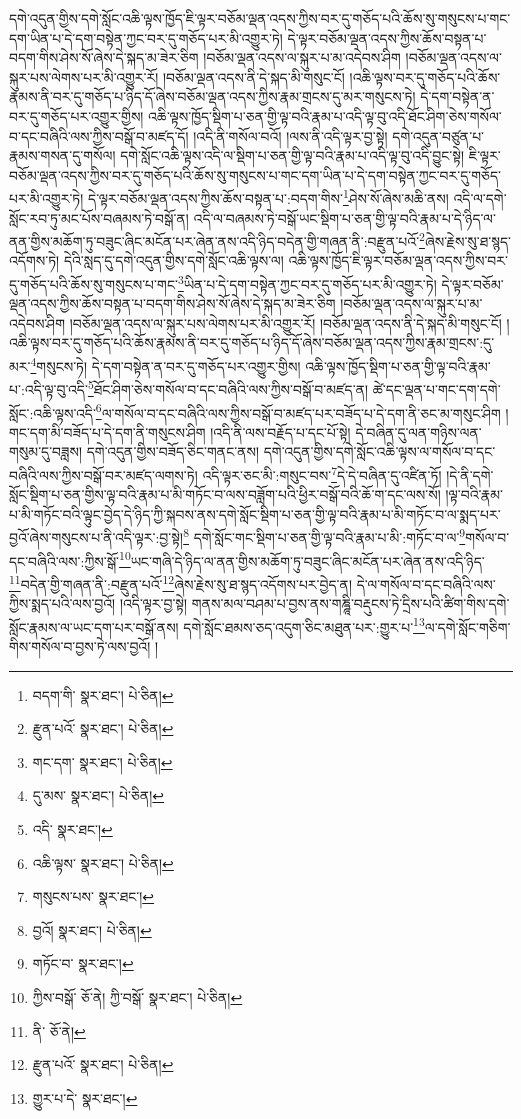 དགེ་འདུན་གྱིས་དགེ་སློང་འཆི་ལྟས་ཁྱོད་ཇི་ལྟར་བཅོམ་ལྡན་འདས་ཀྱིས་བར་དུ་གཅོད་པའི་ཆོས་སུ་གསུངས་པ་གང་དག་ཡིན་པ་དེ་དག་བསྟེན་ཀྱང་བར་དུ་གཅོད་པར་མི་འགྱུར་ཏེ། དེ་ལྟར་བཅོམ་ལྡན་འདས་ཀྱིས་ཆོས་བསྟན་པ་བདག་གིས་ཤེས་སོ་ཞེས་དེ་སྐད་མ་ཟེར་ཅིག །བཅོམ་ལྡན་འདས་ལ་སྐུར་པ་མ་འདེབས་ཤིག །བཅོམ་ལྡན་འདས་ལ་སྐུར་པས་ལེགས་པར་མི་འགྱུར་རོ། །བཅོམ་ལྡན་འདས་ནི་དེ་སྐད་མི་གསུང་ངོ། །འཆི་ལྟས་བར་དུ་གཅོད་པའི་ཆོས་རྣམས་ནི་བར་དུ་གཅོད་པ་ཉིད་དོ་ཞེས་བཅོམ་ལྡན་འདས་ཀྱིས་རྣམ་གྲངས་དུ་མར་གསུངས་ཏེ། དེ་དག་བསྟེན་ན་བར་དུ་གཅོད་པར་འགྱུར་གྱིས། འཆི་ལྟས་ཁྱོད་སྡིག་པ་ཅན་གྱི་ལྟ་བའི་རྣམ་པ་འདི་ལྟ་བུ་འདི་ཐོང་ཤིག་ཅེས་གསོལ་བ་དང་བཞིའི་ལས་ཀྱིས་བསྒོ་བ་མཛད་དོ། །འདི་ནི་གསོལ་བའོ། །ལས་ནི་འདི་ལྟར་བྱ་སྟེ། དགེ་འདུན་བཙུན་པ་རྣམས་གསན་དུ་གསོལ། དགེ་སློང་འཆི་ལྟས་འདི་ལ་སྡིག་པ་ཅན་གྱི་ལྟ་བའི་རྣམ་པ་འདི་ལྟ་བུ་འདི་བྱུང་སྟེ། ཇི་ལྟར་བཅོམ་ལྡན་འདས་ཀྱིས་བར་དུ་གཅོད་པའི་ཆོས་སུ་གསུངས་པ་གང་དག་ཡིན་པ་དེ་དག་བསྟེན་ཀྱང་བར་དུ་གཅོད་པར་མི་འགྱུར་ཏེ། དེ་ལྟར་བཅོམ་ལྡན་འདས་ཀྱིས་ཆོས་བསྟན་པ་:བདག་གིས་\footnote{བདག་གི་  སྣར་ཐང་།  པེ་ཅིན། }ཤེས་སོ་ཞེས་མཆི་ནས། འདི་ལ་དགེ་སློང་རབ་ཏུ་མང་པོས་བཞམས་ཏེ་བསྒོ་ན། འདི་ལ་བཞམས་ཏེ་བསྒོ་ཡང་སྡིག་པ་ཅན་གྱི་ལྟ་བའི་རྣམ་པ་དེ་ཉིད་ལ་ནན་གྱིས་མཆོག་ཏུ་བཟུང་ཞིང་མངོན་པར་ཞེན་ནས་འདི་ཉིད་བདེན་གྱི་གཞན་ནི་:བརྫུན་པའོ་\footnote{རྫུན་པའོ་  སྣར་ཐང་།  པེ་ཅིན། }ཞེས་རྗེས་སུ་ཐ་སྙད་འདོགས་ཏེ། དེའི་སླད་དུ་དགེ་འདུན་གྱིས་དགེ་སློང་འཆི་ལྟས་ལ། འཆི་ལྟས་ཁྱོད་ཇི་ལྟར་བཅོམ་ལྡན་འདས་ཀྱིས་བར་དུ་གཅོད་པའི་ཆོས་སུ་གསུངས་པ་གང་\footnote{གང་དག་  སྣར་ཐང་།  པེ་ཅིན། }ཡིན་པ་དེ་དག་བསྟེན་ཀྱང་བར་དུ་གཅོད་པར་མི་འགྱུར་ཏེ། དེ་ལྟར་བཅོམ་ལྡན་འདས་ཀྱིས་ཆོས་བསྟན་པ་བདག་གིས་ཤེས་སོ་ཞེས་དེ་སྐད་མ་ཟེར་ཅིག །བཅོམ་ལྡན་འདས་ལ་སྐུར་པ་མ་འདེབས་ཤིག །བཅོམ་ལྡན་འདས་ལ་སྐུར་པས་ལེགས་པར་མི་འགྱུར་རོ། །བཅོམ་ལྡན་འདས་ནི་དེ་སྐད་མི་གསུང་ངོ། །འཆི་ལྟས་བར་དུ་གཅོད་པའི་ཆོས་རྣམས་ནི་བར་དུ་གཅོད་པ་ཉིད་དོ་ཞེས་བཅོམ་ལྡན་འདས་ཀྱིས་རྣམ་གྲངས་:དུ་མར་\footnote{དུ་མས་  སྣར་ཐང་།  པེ་ཅིན། }གསུངས་ཏེ། དེ་དག་བསྟེན་ན་བར་དུ་གཅོད་པར་འགྱུར་གྱིས། འཆི་ལྟས་ཁྱོད་སྡིག་པ་ཅན་གྱི་ལྟ་བའི་རྣམ་པ་:འདི་ལྟ་བུ་འདི་\footnote{འདི་  སྣར་ཐང་། }ཐོང་ཤིག་ཅེས་གསོལ་བ་དང་བཞིའི་ལས་ཀྱིས་བསྒོ་བ་མཛད་ན། ཚེ་དང་ལྡན་པ་གང་དག་དགེ་སློང་:འཆི་ལྟས་འདི་\footnote{འཆི་ལྟས་  སྣར་ཐང་།  པེ་ཅིན། }ལ་གསོལ་བ་དང་བཞིའི་ལས་ཀྱིས་བསྒོ་བ་མཛད་པར་བཟོད་པ་དེ་དག་ནི་ཅང་མ་གསུང་ཤིག །གང་དག་མི་བཟོད་པ་དེ་དག་ནི་གསུངས་ཤིག །འདི་ནི་ལས་བརྗོད་པ་དང་པོ་སྟེ། དེ་བཞིན་དུ་ལན་གཉིས་ལན་གསུམ་དུ་བཟླས། དགེ་འདུན་གྱིས་བཟོད་ཅིང་གནང་ནས། དགེ་འདུན་གྱིས་དགེ་སློང་འཆི་ལྟས་ལ་གསོལ་བ་དང་བཞིའི་ལས་ཀྱིས་བསྒོ་བར་མཛད་ལགས་ཏེ། འདི་ལྟར་ཅང་མི་:གསུང་བས་\footnote{གསུངས་པས་  སྣར་ཐང་། }དེ་དེ་བཞིན་དུ་འཛིན་ཏོ། །དེ་ནི་དགེ་སློང་སྡིག་པ་ཅན་གྱིས་ལྟ་བའི་རྣམ་པ་མི་གཏོང་བ་ལས་བཟློག་པའི་ཕྱིར་བསྒོ་བའི་ཆོ་ག་དང་ལས་སོ། །ལྟ་བའི་རྣམ་པ་མི་གཏོང་བའི་ལྟུང་བྱེད་དེ་ཉིད་ཀྱི་སྐབས་ནས་དགེ་སློང་སྡིག་པ་ཅན་གྱི་ལྟ་བའི་རྣམ་པ་མི་གཏོང་བ་ལ་སྨད་པར་བྱའོ་ཞེས་གསུངས་པ་ནི་འདི་ལྟར་:བྱ་སྟེ།\footnote{བྱའོ།  སྣར་ཐང་།  པེ་ཅིན། } དགེ་སློང་གང་སྡིག་པ་ཅན་གྱི་ལྟ་བའི་རྣམ་པ་མི་:གཏོང་བ་ལ་\footnote{གཏོང་བ་  སྣར་ཐང་། }གསོལ་བ་དང་བཞིའི་ལས་:ཀྱིས་སྒོ་\footnote{ཀྱིས་བསྒོ་  ཅོ་ནེ། ཀྱི་བསྒོ་  སྣར་ཐང་།  པེ་ཅིན། }ཡང་གཞི་དེ་ཉིད་ལ་ནན་གྱིས་མཆོག་ཏུ་བཟུང་ཞིང་མངོན་པར་ཞེན་ནས་འདི་ཉིད་\footnote{ནི་  ཅོ་ནེ། }བདེན་གྱི་གཞན་ནི་:བརྫུན་པའོ་\footnote{རྫུན་པའོ་  སྣར་ཐང་།  པེ་ཅིན། }ཞེས་རྗེས་སུ་ཐ་སྙད་འདོགས་པར་བྱེད་ན། དེ་ལ་གསོལ་བ་དང་བཞིའི་ལས་ཀྱིས་སྨད་པའི་ལས་བྱའོ། །འདི་ལྟར་བྱ་སྟེ། གནས་མལ་བཤམ་པ་བྱས་ནས་གཎྜཱི་བརྡུངས་ཏེ་དྲིས་པའི་ཚིག་གིས་དགེ་སློང་རྣམས་ལ་ཡང་དག་པར་བསྒོ་ནས། དགེ་སློང་ཐམས་ཅད་འདུག་ཅིང་མཐུན་པར་:གྱུར་པ་\footnote{གྱུར་པ་དེ་  སྣར་ཐང་། }ལ་དགེ་སློང་གཅིག་གིས་གསོལ་བ་བྱས་ཏེ་ལས་བྱའོ། །
